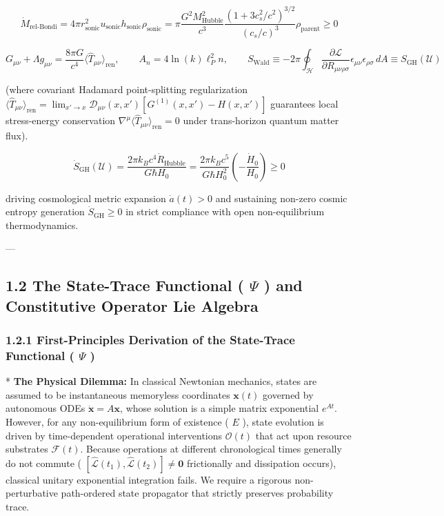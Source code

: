 \documentclass[11pt,a4paper]{article}
\theoremstyle{definition}
\theoremstyle{remark}
\begin{document}
\begin{equation}
\boxed{\dot{M}_{\text{rel-Bondi}} = 4\pi r_{\text{sonic}}^2 u_{\text{sonic}} h_{\text{sonic}} \rho_{\text{sonic}} = \pi \frac{G^2 M_{\text{Hubble}}^2}{c^3} \frac{\left( 1 + 3 c_s^2/c^2 \right)^{3/2}}{(c_s/c)^3} \rho_{\text{parent}} \ge 0}
\end{equation}



\begin{equation}
\boxed{G_{\mu\nu} + \Lambda g_{\mu\nu} = \frac{8\pi G}{c^4} \langle \hat{T}_{\mu\nu} \rangle_{\text{ren}}, \qquad A_n = 4 \ln(k) \ell_P^2 n, \qquad S_{\text{Wald}} \equiv -2\pi \oint_{\mathcal{H}} \frac{\partial \mathcal{L}}{\partial R_{\mu\nu\rho\sigma}} \epsilon_{\mu\nu}\epsilon_{\rho\sigma} \, dA \equiv S_{\text{GH}}(\mathcal{U})}
\end{equation}


(where covariant Hadamard point-splitting regularization $\langle \hat{T}_{\mu\nu} \rangle_{\text{ren}} = \lim_{x'\to x} \mathcal{D}_{\mu\nu}(x, x') [G^{(1)}(x, x') - H(x, x')]$ guarantees local stress-energy conservation $\nabla^\mu \langle \hat{T}_{\mu\nu} \rangle_{\text{ren}} = 0$ under trans-horizon quantum matter flux).


\begin{equation}
\boxed{\dot{S}_{\text{GH}}(\mathcal{U}) = \frac{2\pi k_B c^4 \dot{R}_{\text{Hubble}}}{G \hbar H_0} = \frac{2\pi k_B c^5}{G \hbar H_0^2} \left( -\frac{\dot{H}_0}{H_0} \right) \ge 0}
\end{equation}


driving cosmological metric expansion $\dot{a}(t) > 0$ and sustaining non-zero cosmic entropy generation $\dot{S}_{\text{GH}} \ge 0$ in strict compliance with open non-equilibrium thermodynamics.

---

\subsection{1.2 The State-Trace Functional ( $\Psi$ ) and Constitutive Operator Lie Algebra}

\subsubsection{1.2.1 First-Principles Derivation of the State-Trace Functional ( $\Psi$ )}
* \textbf{The Physical Dilemma:} In classical Newtonian mechanics, states are assumed to be instantaneous memoryless coordinates $\mathbf{x}(t)$ governed by autonomous ODEs $\dot{\mathbf{x}} = A \mathbf{x}$, whose solution is a simple matrix exponential $e^{At}$. However, for any non-equilibrium form of existence ( $E$ ), state evolution is driven by time-dependent operational interventions $\mathcal{O}(t)$ that act upon resource substrates $\mathcal{F}(t)$. Because operations at different chronological times generally do not commute ( $[ \hat{\mathcal{L}}(t_1), \hat{\mathcal{L}}(t_2) ] \neq \mathbf{0}$ frictionally and dissipation occurs), classical unitary exponential integration fails. We require a rigorous non-perturbative path-ordered state propagator that strictly preserves probability trace.
\end{document}
